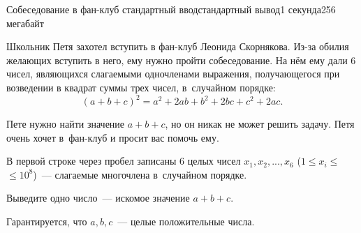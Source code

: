 \begin{problem}[(Парников В.\,В.)]{Собеседование в фан-клуб \label{fanclub}}{стандартный ввод}{стандартный вывод}{1 секунда}{256 мегабайт}

Школьник Петя захотел вступить в фан-клуб Леонида Скорнякова. Из-за обилия желающих вступить в него, ему нужно пройти собеседование. На нём ему дали 6 чисел, являющихся слагаемыми одночленами выражения, получающегося при возведении в квадрат суммы трех чисел, в~случайном порядке:
$$(a + b + c)^2 = a^2 + 2 a b + b^2 + 2 b c + c^2 + 2 a c.$$

Пете нужно найти значение $a+b+c$, но он никак не может решить задачу. Петя очень хочет в~фан-клуб и просит вас помочь ему.

\InputFile
В первой строке через пробел записаны 6 целых чисел $x_1, x_2, ..., x_6$ ($1 \leq x_i \leq$ $\leq 10^8$)~--- слагаемые многочлена в~случайном порядке.

\OutputFile
Выведите одно число~--- искомое значение $a + b + c$.

\Example

\begin{example}
%
\end{example}

\Note
Гарантируется, что $a, b, c$~--- целые положительные числа.

\end{problem}

